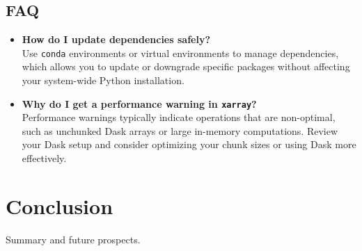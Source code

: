 \documentclass[a4paper,12pt]{article}
\begin{document}
\subsection{FAQ}
\begin{itemize}
    \item \textbf{How do I update dependencies safely?} \\
    Use \texttt{conda} environments or virtual environments to manage dependencies, which allows you to update or downgrade specific packages without affecting your system-wide Python installation.

    \item \textbf{Why do I get a performance warning in \texttt{xarray}?} \\
    Performance warnings typically indicate operations that are non-optimal, such as unchunked Dask arrays or large in-memory computations. Review your Dask setup and consider optimizing your chunk sizes or using Dask more effectively.
\end{itemize}

\section{Conclusion}
\label{sec:conclusion}
Summary and future prospects.
\end{document}
